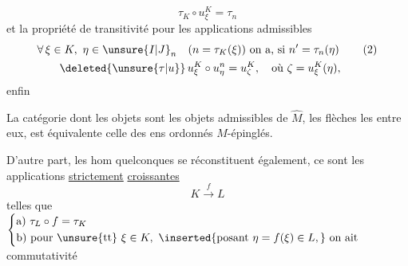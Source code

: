 \begingroup\makeatletter\tagsleft@true\makeatother
\[
\tau_K\circ u_\xi^K=\tau_n\tag*{(1)}
\]
et la propriété de transitivité pour les applications admissibles
\[
\begin{aligned}[t]
&\forall\,\xi\in K,\ \eta\in {\unsure{I|J}}_n\quad(n=\tau_K(\xi))\ \text{on a, si }n'=\tau_n(\eta)\\
&\qquad\deleted{\unsure{\tau|u}}\,u_\xi^K\circ u_\eta^n=u_\zeta^K,\quad\text{où }\zeta=u_\xi^K(\eta),
\end{aligned}\tag*{(2)}
\]
\endgroup
enfin


La catégorie dont les objets sont les objets admissibles de $\widehat M$, les flèches les  entre eux, est équivalente  celle des ens ordonnés $M$-épinglés.

D'autre part, les hom quelconques  se réconstituent également, ce sont les applications \uline{strictement} \uline{croissantes}
\[
K\xrightarrow{f}L
\]
telles que $\left\{\begin{aligned}
&\text{a) }\tau_L\circ f=\tau_K\\
&\text{b) pour \unsure{tt} }\xi\in K,\ \inserted{\text{posant }\eta=f(\xi)\in L,}\ \text{on ait}
\end{aligned}\right.$ commutativité 
